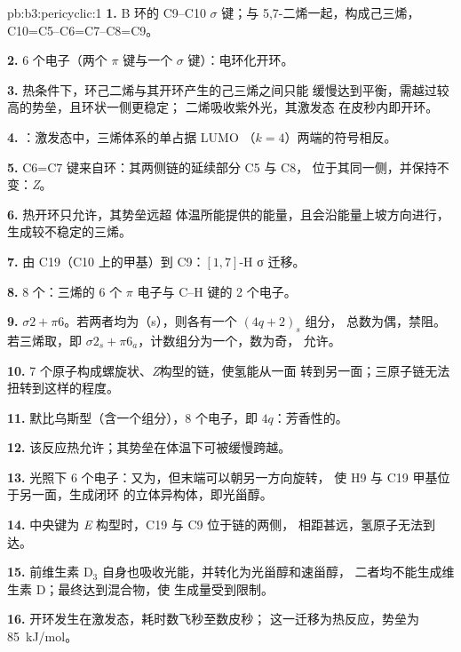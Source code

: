 \begin{solution}{pb:b3:pericyclic:1}
\textbf{1.} B 环的 C9--C10 $\sigma$ 键；与 5,7-二烯一起，构成己三烯，
C10=C5--C6=C7--C8=C9。

\textbf{2.} 6 个电子（两个 $\pi$ 键与一个 $\sigma$ 键）：电环化开环。

\textbf{3.} 热条件下，环己二烯与其开环产生的己三烯之间只能
缓慢达到平衡，需越过较高的势垒，且环状一侧更稳定；
二烯吸收紫外光，其激发态
在皮秒内即开环。

\textbf{4.} ：激发态中，三烯体系的单占据 LUMO
（$k = 4$）两端的符号相反。

\textbf{5.} C6=C7 键来自环：其两侧链的延续部分 C5 与 C8，
位于其同一侧，并保持不变：\textit{Z}。

\textbf{6.} 热开环只允许，其势垒远超
体温所能提供的能量，且会沿能量上坡方向进行，生成较不稳定的三烯。

\textbf{7.} 由 C19（C10 上的甲基）到 C9：$[1,7]$-H σ 迁移。

\textbf{8.} 8 个：三烯的 6 个 $\pi$ 电子与 C--H 键的 2 个电子。

\textbf{9.} $\sigma2 + \pi6$。若两者均为（s），则各有一个 $(4q + 2)_s$ 组分，
总数为偶，禁阻。若三烯取，即 $\sigma2_s + \pi6_a$，计数组分为一个，数为奇，
允许。

\textbf{10.} 7 个原子构成螺旋状、\textit{Z}构型的链，使氢能从一面
转到另一面；三原子链无法扭转到这样的程度。

\textbf{11.} 默比乌斯型（含一个组分），8 个电子，即 $4q$：芳香性的。

\textbf{12.} 该反应热允许；其势垒在体温下可被缓慢跨越。

\textbf{13.} 光照下 6 个电子：又为，但末端可以朝另一方向旋转，
使 H9 与 C19 甲基位于另一面，生成闭环
的立体异构体，即光甾醇。

\textbf{14.} 中央键为 \textit{E} 构型时，C19 与 C9 位于链的两侧，
相距甚远，氢原子无法到达。

\textbf{15.} 前维生素 D$_3$ 自身也吸收光能，并转化为光甾醇和速甾醇，
二者均不能生成维生素 D；最终达到混合物，使
生成量受到限制。

\textbf{16.} 开环发生在激发态，耗时数飞秒至数皮秒；
这一迁移为热反应，势垒为 \qty{85}{kJ/mol}。


\end{solution}
